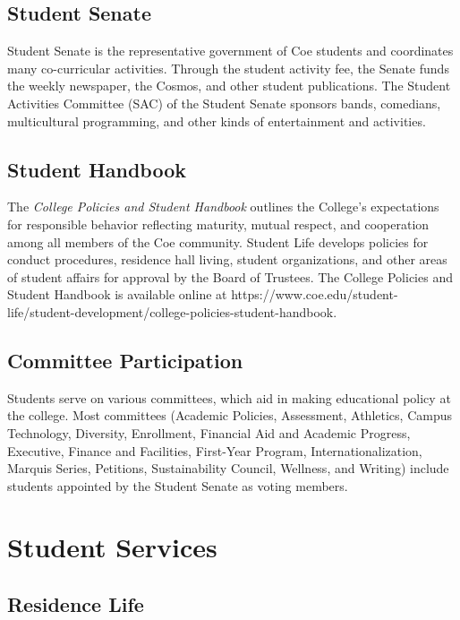 \documentclass[
  letterpaper,
]{scrbook}
\begin{document}
\subsection{Student Senate}\label{student-senate}

Student Senate is the representative government of Coe students and
coordinates many co-curricular activities. Through the student activity
fee, the Senate funds the weekly newspaper, the Cosmos, and other
student publications. The Student Activities Committee (SAC) of the
Student Senate sponsors bands, comedians, multicultural programming, and
other kinds of entertainment and activities.

\subsection{Student Handbook}\label{student-handbook}

The \emph{College Policies and Student Handbook} outlines the College's
expectations for responsible behavior reflecting maturity, mutual
respect, and cooperation among all members of the Coe community. Student
Life develops policies for conduct procedures, residence hall living,
student organizations, and other areas of student affairs for approval
by the Board of Trustees. The College Policies and Student Handbook is
available online at
https://www.coe.edu/student-life/student-development/college-policies-student-handbook.

\subsection{Committee Participation}\label{committee-participation}

Students serve on various committees, which aid in making educational
policy at the college. Most committees (Academic Policies, Assessment,
Athletics, Campus Technology, Diversity, Enrollment, Financial Aid and
Academic Progress, Executive, Finance and Facilities, First-Year
Program, Internationalization, Marquis Series, Petitions, Sustainability
Council, Wellness, and Writing) include students appointed by the
Student Senate as voting members.

\section{Student Services}\label{student-services}

\subsection{Residence Life}\label{residence-life}
\end{document}

